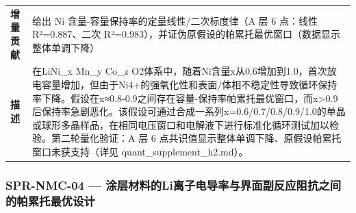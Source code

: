 \documentclass[12pt,a4paper]{ctexart}
\begin{document}
{\begin{longtable}[]{@{}
  >{\raggedright\arraybackslash}p{}
  >{\raggedright\arraybackslash}p{}@{}}
\textbf{增量贡献} & 给出 Ni 含量-容量保持率的定量线性/二次标度律（A 层 6 点：线性 R²=0.887、二次 R²=0.983），并证伪原假设的帕累托最优窗口（数据显示整体单调下降） \\
\textbf{描述} & 在LiNi\_x Mn\_y Co\_z O2体系中，随着Ni含量x从0.6增加到1.0，首次放电容量增加，但由于Ni4+的强氧化性和表面/体相不稳定性导致循环保持率下降。假设在x≈0.8-0.9之间存在容量-保持率帕累托最优窗口，而x\textgreater0.9后保持率急剧恶化。该假设可通过合成一系列x=0.6/0.7/0.8/0.9/1.0的单晶或球形多晶样品，在相同电压窗口和电解液下进行标准化循环测试加以检验。第二轮量化验证：A 层 6 点共识值显示整体单调下降、原假设帕累托窗口未获支持（详见 quant\_supplement\_h2.md）。 \\
\end{longtable}
}

\subsubsection{SPR-NMC-04 --- 涂层材料的Li离子电导率与界面副反应阻抗之间的帕累托最优设计}\label{spr-nmc-04-ux6d82ux5c42ux6750ux6599ux7684liux79bbux5b50ux7535ux5bfcux7387ux4e0eux754cux9762ux526fux53cdux5e94ux963bux6297ux4e4bux95f4ux7684ux5e15ux7d2fux6258ux6700ux4f18ux8bbeux8ba1}
\end{document}
